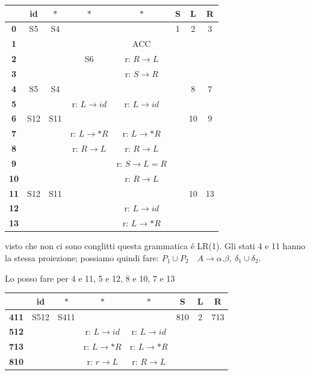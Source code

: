 \begin{tabular}{|c|c|c|c|c|c|c|c|}
	\hline
		&	\textbf{id} 	& $\bm{*}$	& $\bm{*}$	& $\bm{*}$	& 	\textbf{S}  & \textbf{L} & \textbf{R} \\  
	\hline
	\textbf{0}	&	S5 	& S4 	& 		& 		& 1 	& 2 	& 3 	\\
	\hline
	\textbf{1}	&		& 		& 		& ACC 	& 		& 		& 		\\
	\hline
	\textbf{2}	&		& 		& S6 	& r: $R \rightarrow L$ & 	& 	 	& 		\\
	\hline
	\textbf{3}	&		& 		& 		& r: $S \rightarrow R$ & 	& 		& 		\\
	\hline
	\textbf{4}	&	S5 & S4 	& 		& 						&	& 8 	& 7		\\
	\hline
	\textbf{5}	&		&		& r: $L \rightarrow id$ & r: $L \rightarrow id$ & 	&	&	\\
	\hline
	\textbf{6}	&	S12 & S11 	& 		& 						&	& 10 	& 9		\\	
	\hline
	\textbf{7}	&		&		& r: $L \rightarrow *R$ & r: $L \rightarrow *R$ & 	&	&	\\
	\hline
	\textbf{8}	&		&		& r: $R \rightarrow L$ & r: $R \rightarrow L$  & 	&	&	\\	
	\hline
	\textbf{9}	&		& 		& 		& r: $S \rightarrow L = R$ & 	& 		& 		\\	
	\hline
	\textbf{10}	&		& 		& 		& r: $R \rightarrow L$ & 	& 		& 		\\	
	\hline
	\textbf{11}	&	S12 & S11 	& 		& 						&	& 10 	& 13		\\		
	\hline
	\textbf{12}	&		& 		& 		& r: $L \rightarrow id$ & 	& 		& 		\\		
	\hline
	\textbf{13}	&		& 		& 		& r: $L \rightarrow *R$ & 	& 		& 		\\		
	\hline
\end{tabular}

visto che non ci sono conglitti questa grammatica \'e LR(1).
Gli stati 4 e 11 hanno la stessa proiezione; possiamo quindi fare: 
$P_1 \cup P_2\quad A \rightarrow \alpha . \beta,\ \delta_1 \cup \delta_2$.

Lo posso fare per 4 e 11, 5 e 12, 8 e 10, 7 e 13

\begin{tabular}{|c|c|c|c|c|c|c|c|}
	\hline
		&	\textbf{id} 	& $\bm{*}$	& $\bm{*}$	& $\bm{*}$	& 	\textbf{S}  & \textbf{L} & \textbf{R} \\  
	\hline
	\textbf{411}	&	S512 & S411 	& 		& 		& 810 	& 2 	& 713 	\\
	\hline
	\textbf{512}	&		& 		& r: $L \rightarrow id$		& r: $L \rightarrow id$ 	& 		& 		& 		\\
	\hline
	\textbf{713}	&		& 		& r: $L \rightarrow *R$ 	& r: $L \rightarrow *R$		& 		& 	 	& 		\\
	\hline
	\textbf{810}	&		& 		& r: $r \rightarrow L$ 	& r: $R \rightarrow L$		& 		& 	 	& 		\\
	\hline
\end{tabular}

